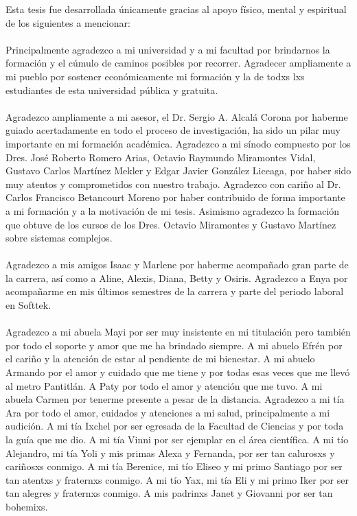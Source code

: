 Esta tesis fue desarrollada únicamente gracias al apoyo físico, mental y espiritual de los siguientes a mencionar:\\
\\
Principalmente agradezco a mi universidad y a mi facultad por brindarnos la formación y el cúmulo de caminos posibles por recorrer. Agradecer ampliamente a mi pueblo por sostener económicamente mi formación y la de todxs lxs estudiantes de esta universidad pública y gratuita.\\
\\
Agradezco ampliamente a mi asesor, el Dr. Sergio A. Alcalá Corona por haberme guiado acertadamente en todo el proceso de investigación, ha sido un pilar muy importante en mi formación académica. Agradezco a mi sínodo compuesto por los Dres. José Roberto Romero Arias, Octavio Raymundo Miramontes Vidal, Gustavo Carlos Martínez Mekler y Edgar Javier González Liceaga, por haber sido muy atentos y comprometidos con nuestro trabajo. Agradezco con cariño al Dr. Carlos Francisco Betancourt Moreno por haber contribuido de forma importante a mi formación y a la motivación de mi tesis. Asimismo agradezco la formación que obtuve de los cursos de los Dres. Octavio Miramontes y Gustavo Martínez sobre sistemas complejos.\\
\\
Agradezco a mis amigos Isaac y Marlene por haberme acompañado gran parte de la carrera, así como a Aline, Alexis, Diana, Betty y Osiris. Agradezco a Enya por acompañarme en mis últimos semestres de la carrera y parte del periodo laboral en Softtek.\\
\\
Agradezco a mi abuela Mayi por ser muy insistente en mi titulación pero también por todo el soporte y amor que me ha brindado siempre. A mi abuelo Efrén por el cariño y la atención de estar al pendiente de mi bienestar. A mi abuelo Armando por el amor y cuidado que me tiene y por todas esas veces que me llevó al metro Pantitlán. A Paty por todo el amor y atención que me tuvo. A mi abuela Carmen por tenerme presente a pesar de la distancia.
\newpage
Agradezco a mi tía Ara por todo el amor, cuidados y atenciones a mi salud, principalmente a mi audición. A mi tía Ixchel por ser egresada de la Facultad de Ciencias y por toda la guía que me dio. A mi tía Vinni por ser ejemplar en el área científica. A mi tío Alejandro, mi tía Yoli y mis primas Alexa y Fernanda, por ser tan calurosxs y cariñosxs conmigo. A mi tía Berenice, mi tío Eliseo y mi primo Santiago por ser tan atentxs y fraternxs conmigo. A mi tío Yax, mi tía Eli y mi primo Iker por ser tan alegres y fraternxs conmigo. A mis padrinxs Janet y Giovanni por ser tan bohemixs.\\
